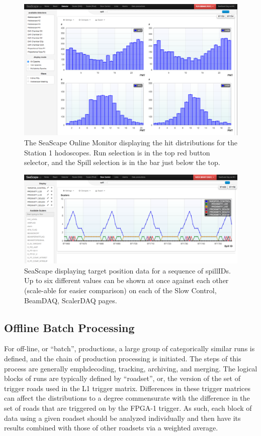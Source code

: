 \begin{figure}
	\centering
	\includegraphics[width=\textwidth]{figures/production/SeaScape-wiremap.png}
	\caption{The SeaScape Online Monitor displaying the hit distributions for the Station 1 hodoscopes. Run selection is in the top red button selector, and the Spill selection is in the bar just below the top.}
	\label{fig:seascape-wiremaps}
\end{figure}
\begin{figure}
	\centering
	\includegraphics[width=\textwidth]{figures/production/SeaScape-targPos.png}
	\caption{SeaScape displaying target position data for a sequence of spillIDs. Up to six different values can be shown at once against each other (scale-able for easier comparison) on each of the Slow Control, BeamDAQ, ScalerDAQ pages.}
	\label{fig:seascape-targpos}
\end{figure}

\subsection{Offline Batch Processing}

For off-line, or ``batch'', productions, a large group of categorically similar runs is defined, and the chain of production processing is initiated. The steps of this process are generally emph{decoding, tracking, archiving, and merging}. The logical blocks of runs are typically defined by ``roadset'', or, the version of the set of trigger roads used in the L1 trigger matrix. Differences in these trigger matrices can affect the distributions to a degree commensurate with the difference in the set of roads that are triggered on by the FPGA-1 trigger. As such, each block of data using a given roadset should be analyzed individually and then have its results combined with those of other roadsets via a weighted average.

